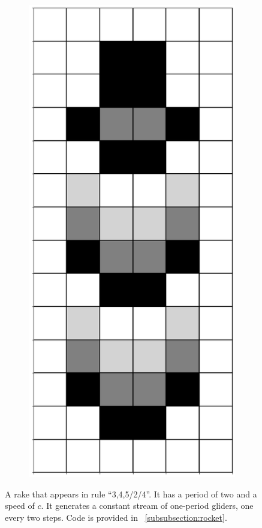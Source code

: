\documentclass[12pt]{article}
\numberwithin{figure}{section} %
\begin{document}
\begin{figure}[H]
\begin{subfigure}{0.18\textwidth}
     	\subcaption{}
   	\end{subfigure}
	\begin{subfigure}{0.18\textwidth}
     	\centering
     	\includegraphics[width=\linewidth]{Section4/34.4}
     	\subcaption{}
   	\end{subfigure}
   \caption[A rocket glider]{A rake that appears in rule “3,4,5/2/4”. It has a period of two and a speed of $c$. It generates a constant stream of one-period gliders, one every two steps. Code is provided in ~\ref{subsubsection:rocket}.}
   \label{fig:rocket}
      \vspace{-1.5em}
\end{figure}
\end{document}
